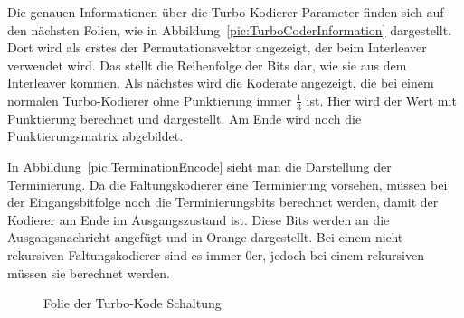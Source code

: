 Die genauen Informationen über die Turbo-Kodierer Parameter finden sich auf den nächsten Folien, wie in Abbildung~\ref{pic:TurboCoderInformation} dargestellt. Dort wird als erstes der Permutationsvektor angezeigt, der beim Interleaver verwendet wird. Das stellt die Reihenfolge der Bits dar, wie sie aus dem Interleaver kommen. Als nächstes wird die Koderate angezeigt, die bei einem normalen Turbo-Kodierer ohne Punktierung immer $\frac{1}{3}$ ist. Hier wird der Wert mit Punktierung berechnet und dargestellt. Am Ende wird noch die Punktierungsmatrix abgebildet. 

In Abbildung~\ref{pic:TerminationEncode} sieht man die Darstellung der Terminierung. Da die Faltungskodierer eine Terminierung vorsehen, müssen bei der Eingangsbitfolge noch die Terminierungsbits berechnet werden, damit der Kodierer am Ende im Ausgangszustand ist. Diese Bits werden an die Ausgangsnachricht angefügt und in Orange dargestellt. Bei einem nicht rekursiven Faltungskodierer sind es immer 0er, jedoch bei einem rekursiven müssen sie berechnet werden.

\begin{figure}[th]
\centering
{}
\caption{Folie der Turbo-Kode Schaltung}
\label{pic:TurboEncode}
\end{figure}
	
